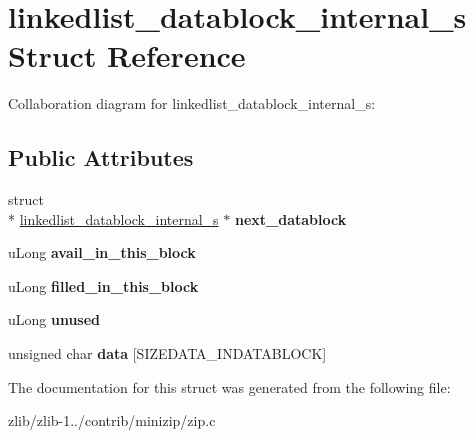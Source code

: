 \hypertarget{structlinkedlist__datablock__internal__s}{\section{linkedlist\+\_\+datablock\+\_\+internal\+\_\+s Struct Reference}
\label{structlinkedlist__datablock__internal__s}
}


Collaboration diagram for linkedlist\+\_\+datablock\+\_\+internal\+\_\+s\+:
\subsection*{Public Attributes}
\begin{DoxyCompactItemize}
\item 
\hypertarget{structlinkedlist__datablock__internal__s_a1f5abadbf41d82b8724a048a33c4c153}{struct \\*
\hyperlink{structlinkedlist__datablock__internal__s}{linkedlist\+\_\+datablock\+\_\+internal\+\_\+s} $\ast$ {\bfseries next\+\_\+datablock}}\label{structlinkedlist__datablock__internal__s_a1f5abadbf41d82b8724a048a33c4c153}

\item 
\hypertarget{structlinkedlist__datablock__internal__s_a1d63f75d88f05ee665221ccf618a57ed}{u\+Long {\bfseries avail\+\_\+in\+\_\+this\+\_\+block}}\label{structlinkedlist__datablock__internal__s_a1d63f75d88f05ee665221ccf618a57ed}

\item 
\hypertarget{structlinkedlist__datablock__internal__s_a76ae854b6029e6617c7544d2eb311f77}{u\+Long {\bfseries filled\+\_\+in\+\_\+this\+\_\+block}}\label{structlinkedlist__datablock__internal__s_a76ae854b6029e6617c7544d2eb311f77}

\item 
\hypertarget{structlinkedlist__datablock__internal__s_ae7275ad9d24cbe4f4c062f29abfb3b91}{u\+Long {\bfseries unused}}\label{structlinkedlist__datablock__internal__s_ae7275ad9d24cbe4f4c062f29abfb3b91}

\item 
\hypertarget{structlinkedlist__datablock__internal__s_a04900ee41fa2247a73b7570ec162bb1d}{unsigned char {\bfseries data} \mbox{[}S\+I\+Z\+E\+D\+A\+T\+A\+\_\+\+I\+N\+D\+A\+T\+A\+B\+L\+O\+C\+K\mbox{]}}\label{structlinkedlist__datablock__internal__s_a04900ee41fa2247a73b7570ec162bb1d}

\end{DoxyCompactItemize}


The documentation for this struct was generated from the following file\+:\begin{DoxyCompactItemize}
\item 
zlib/zlib-\/1../contrib/minizip/zip.\+c\end{DoxyCompactItemize}
